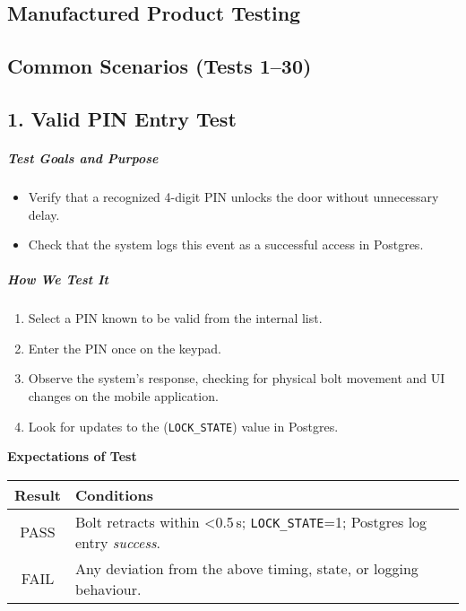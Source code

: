 \newpage
\begin{samepage}
    \section{Manufactured Product Testing}
    \subsection{Common Scenarios (Tests 1–30)}
    \subsection*{1. Valid PIN Entry Test}
    \subparagraph{Test Goals and Purpose}
    \begin{itemize}
        \item Verify that a recognized 4-digit PIN unlocks the door without unnecessary delay.
        \item Check that the system logs this event as a successful access in Postgres.
    \end{itemize}
    \subparagraph{How We Test It}
    \begin{enumerate}
        \item Select a PIN known to be valid from the internal list.
        \item Enter the PIN once on the keypad.
        \item Observe the system's response, checking for physical bolt movement and UI changes on the mobile application.
        \item Look for updates to the (\texttt{LOCK\_STATE}) value in Postgres.
    \end{enumerate}
    
    \textbf{Expectations of Test}
    \begin{center}
    \begin{tabular}{|c|p{10cm}|}
      \hline
      \textbf{Result} & \textbf{Conditions} \\
      \hline
      PASS & Bolt retracts within \textless{}0.5\,s; \texttt{LOCK\_STATE}=1; Postgres log entry \emph{success}. \\
      \hline
      FAIL & Any deviation from the above timing, state, or logging behaviour. \\
      \hline
    \end{tabular}
    \end{center}
\end{samepage}


